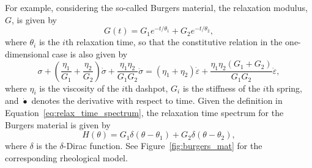 For example, considering the so-called Burgers material, the relaxation modulus, $G$, is given by \citep{malkinRheologyConceptsMethods2017}
\begin{equation}
\label{eq:relaxation_modulus_burgers}
  G(t)=G_{1} e^{-t / \theta_{1}} + G_2 e^{-t/\theta_2},
\end{equation}
where $\theta_i$ is the $i$th relaxation time, so that the constitutive relation in the one-dimensional case is also given by
\begin{equation}
  \sigma + \left(\frac{\eta_1}{G_1} + \frac{\eta_2}{G_2}\right) \dot \sigma + \frac{\eta_1\eta_2}{G_1G_2}\ddot \sigma = (\eta_1 + \eta_2)\dot\varepsilon + \frac{\eta_1\eta_2(G_1 + G_2)}{G_1G_2}\ddot\varepsilon,
\end{equation}
where $\eta_i$ is the viscosity of the $i$th dashpot, $G_i$ is the stiffness of the $i$th spring, and $\dot{\bullet}$ denotes the derivative with respect to time.
Given the definition in Equation~\eqref{eq:relax_time_spectrum}, the relaxation time spectrum for the Burgers material is given by
\begin{equation}
  H(\theta) = G_1 \delta(\theta - \theta_1) + G_2 \delta(\theta - \theta_2),
\end{equation}
where $\delta$ is the $\delta$-Dirac function.
See Figure~\ref{fig:burgers_mat} for the corresponding rheological model.

